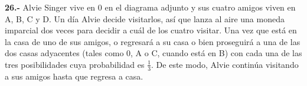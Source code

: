 \documentclass[12pt, letterpaper, spanish]{article}
\newcommand{\jump}{\vskip 0.01cm}
\begin{document}
\textbf{26.-} Alvie Singer vive en 0 en el diagrama adjunto y sus cuatro amigos viven en A, B, C y D. Un día Alvie decide visitarlos, así que lanza al aire una moneda imparcial dos veces para decidir a cuál de los cuatro visitar. Una vez que está en la casa de uno de sus amigos, o regresará a su casa o bien proseguirá a una de las dos casas adyacentes (tales como 0, A o C, cuando está en B) con cada una de las tres posibilidades cuya probabilidad es $\displaystyle\frac{1}{3}$. De este modo, Alvie continúa visitando a sus amigos hasta que regresa a casa.
\jump
\begin{center}
\end{center}
\end{document}
